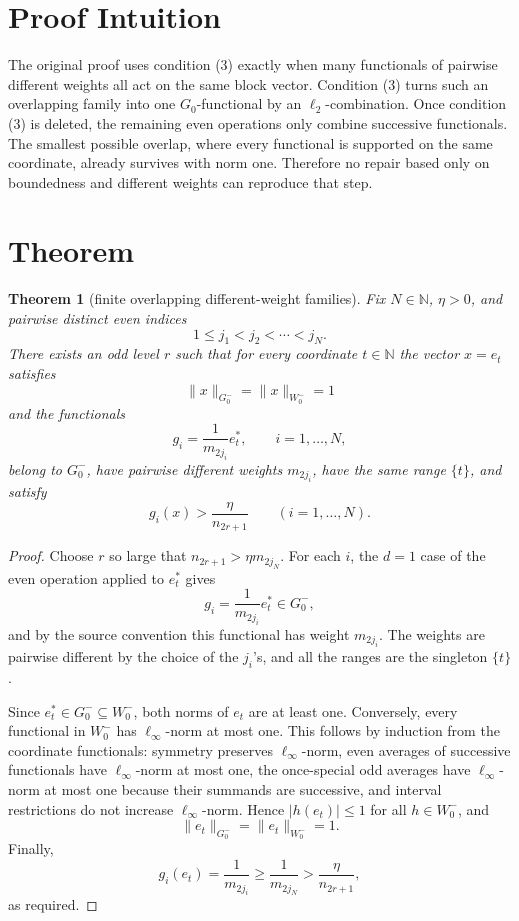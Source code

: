 \documentclass[11pt]{article}
\newtheorem{theorem}{Theorem}
\newcommand{\N}{\mathbb N}
\newcommand{\Gminus}{G_0^-}
\newcommand{\Wminus}{W_0^-}
\begin{document}
\section*{Proof Intuition}

The original proof uses condition (3) exactly when many functionals of
pairwise different weights all act on the same block vector.  Condition (3)
turns such an overlapping family into one \(G_0\)-functional by an
\(\ell_2\)-combination.  Once condition (3) is deleted, the remaining even
operations only combine successive functionals.  The smallest possible
overlap, where every functional is supported on the same coordinate, already
survives with norm one.  Therefore no repair based only on boundedness and
different weights can reproduce that step.

\section*{Theorem}

\begin{theorem}[finite overlapping different-weight families]
Fix \(N\in\N\), \(\eta>0\), and pairwise distinct even indices
\[
  1\le j_1<j_2<\cdots<j_N .
\]
There exists an odd level \(r\) such that for every coordinate \(t\in\N\)
the vector \(x=e_t\) satisfies
\[
  \|x\|_{\Gminus}=\|x\|_{\Wminus}=1
\]
and the functionals
\[
  g_i=\frac1{m_{2j_i}}e_t^*, \qquad i=1,\ldots,N,
\]
belong to \(\Gminus\), have pairwise different weights \(m_{2j_i}\), have
the same range \(\{t\}\), and satisfy
\[
  g_i(x)>\frac{\eta}{n_{2r+1}}
  \qquad (i=1,\ldots,N).
\]
\end{theorem}

\begin{proof}
Choose \(r\) so large that \(n_{2r+1}>\eta m_{2j_N}\).  For each \(i\),
the \(d=1\) case of the even operation applied to \(e_t^*\) gives
\[
  g_i=\frac1{m_{2j_i}}e_t^*\in \Gminus,
\]
and by the source convention this functional has weight \(m_{2j_i}\).
The weights are pairwise different by the choice of the \(j_i\)'s, and all
the ranges are the singleton \(\{t\}\).

Since \(e_t^*\in \Gminus\subseteq \Wminus\), both norms of \(e_t\) are at
least one.  Conversely, every functional in \(\Wminus\) has
\(\ell_\infty\)-norm at most one.  This follows by induction from the
coordinate functionals: symmetry preserves \(\ell_\infty\)-norm, even
averages of successive functionals have \(\ell_\infty\)-norm at most one,
the once-special odd averages have \(\ell_\infty\)-norm at most one because
their summands are successive, and interval restrictions do not increase
\(\ell_\infty\)-norm.  Hence \(|h(e_t)|\le 1\) for all
\(h\in\Wminus\), and
\[
  \|e_t\|_{\Gminus}=\|e_t\|_{\Wminus}=1.
\]
Finally,
\[
  g_i(e_t)=\frac1{m_{2j_i}}
  \ge \frac1{m_{2j_N}}
  > \frac{\eta}{n_{2r+1}},
\]
as required.
\end{proof}
\end{document}
